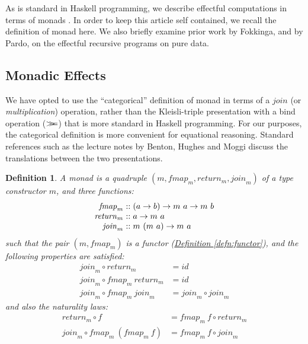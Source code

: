 \documentclass{jfp1}
\newcommand{\mbind}{\mathrel{>\kern-0.45em>\kern-0.45em=}}
\newtheorem{definition}{Definition}
\newcommand{\defref}[1]{\hyperref[#1]{Definition \ref*{#1}}}
\begin{document}
As is standard in Haskell programming, we describe effectful
computations in terms of monads \cite{moggi91notions,
  peytonjones93imperative}. In order to keep this article self
contained, we recall the definition of monad here. We also briefly
examine prior work by Fokkinga, and by Pardo, on the effectful
recursive programs on pure data.

\subsection{Monadic Effects}

We have opted to use the ``categorical'' definition of monad in terms
of a $\mathit{join}$ (or \emph{multiplication}) operation, rather than the
Kleisli-triple presentation with a bind operation ($\mbind$) that is
more standard in Haskell programming. For our purposes, the
categorical definition is more convenient for equational
reasoning. Standard references such as the lecture notes by Benton,
Hughes and Moggi \cite{benton00monads} discuss the translations
between the two presentations.

\begin{definition}\label{defn:monad}
  A monad is a quadruple $(m, \mathit{fmap}_m, \mathit{return}_m,
  \mathit{join}_m)$ of a type constructor $m$, and three functions:
  \begin{displaymath}
    \begin{array}{r@{\hspace{0.3em}}c@{\hspace{0.3em}}l}
      \mathit{fmap}_m   & :: & (a \to b) \to m~a \to m~b \\
      \mathit{return}_m & :: & a \to m~a \\
      \mathit{join}_m   & :: & m~(m~a) \to m~a
    \end{array}
  \end{displaymath}
  such that the pair $(m, \mathit{fmap}_m)$ is a functor
  (\defref{defn:functor}), and the following properties are satisfied:
  \begin{align}
    \label{eq:monad-join-return}
    \mathit{join}_m \circ \mathit{return}_m & = \mathit{id} \\
    \label{eq:monad-join-fmap-return}
    \mathit{join}_m \circ \mathit{fmap}_m~\mathit{return}_m & = \mathit{id} \\
    \label{eq:monad-join-join}
    \mathit{join}_m \circ \mathit{fmap}_m~\mathit{join}_m & = \mathit{join}_m \circ \mathit{join}_m
  \end{align}
  and also the naturality laws:
  \begin{align}
    \label{eq:monad-return-natural}
    \mathit{return}_m \circ f & = \mathit{fmap}_m~f \circ \mathit{return}_m \\
    \label{eq:monad-join-natural}
    \mathit{join}_m \circ \mathit{fmap}_m~(\mathit{fmap}_m~f) & = \mathit{fmap}_m~f \circ \mathit{join}_m
  \end{align}
\end{definition}
\end{document}
